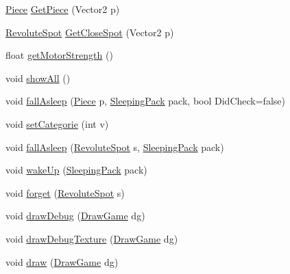 \begin{DoxyCompactItemize}
\item 
\hyperlink{classgearit_1_1src_1_1robot_1_1_piece}{Piece} \hyperlink{classgearit_1_1src_1_1robot_1_1_robot_a52d61f4419b94d1aec0b0838fee09415}{Get\+Piece} (Vector2 p)
\item 
\hyperlink{classgearit_1_1src_1_1robot_1_1_revolute_spot}{Revolute\+Spot} \hyperlink{classgearit_1_1src_1_1robot_1_1_robot_aa347b18c64184d66e2d32ff4f844444c}{Get\+Close\+Spot} (Vector2 p)
\item 
float \hyperlink{classgearit_1_1src_1_1robot_1_1_robot_a6f53b80c92946021a6c167aba200492c}{get\+Motor\+Strength} ()
\item 
void \hyperlink{classgearit_1_1src_1_1robot_1_1_robot_a490e71c6f9c18403b013901844760d0e}{show\+All} ()
\item 
void \hyperlink{classgearit_1_1src_1_1robot_1_1_robot_a20cb38081d33e2c1e69f8229a6b721ea}{fall\+Asleep} (\hyperlink{classgearit_1_1src_1_1robot_1_1_piece}{Piece} p, \hyperlink{classgearit_1_1src_1_1robot_1_1_sleeping_pack}{Sleeping\+Pack} pack, bool Did\+Check=false)
\item 
void \hyperlink{classgearit_1_1src_1_1robot_1_1_robot_af2f16c1240b6009d37b555bd9269b308}{set\+Categorie} (int v)
\item 
void \hyperlink{classgearit_1_1src_1_1robot_1_1_robot_a54ca096aa1e0a7228ce26b77f17cd133}{fall\+Asleep} (\hyperlink{classgearit_1_1src_1_1robot_1_1_revolute_spot}{Revolute\+Spot} s, \hyperlink{classgearit_1_1src_1_1robot_1_1_sleeping_pack}{Sleeping\+Pack} pack)
\item 
void \hyperlink{classgearit_1_1src_1_1robot_1_1_robot_a450b1c0a50d17e1593b7b06b83b1bd10}{wake\+Up} (\hyperlink{classgearit_1_1src_1_1robot_1_1_sleeping_pack}{Sleeping\+Pack} pack)
\item 
void \hyperlink{classgearit_1_1src_1_1robot_1_1_robot_a60ea55dc2a7344abde409f0295e8ba91}{forget} (\hyperlink{classgearit_1_1src_1_1robot_1_1_revolute_spot}{Revolute\+Spot} s)
\item 
void \hyperlink{classgearit_1_1src_1_1robot_1_1_robot_ab6bbb7f8be1a761c89c752d033da343e}{draw\+Debug} (\hyperlink{classgearit_1_1src_1_1_draw_game}{Draw\+Game} dg)
\item 
void \hyperlink{classgearit_1_1src_1_1robot_1_1_robot_a1a6d789f58adfed9b7d1d303a3a9f120}{draw\+Debug\+Texture} (\hyperlink{classgearit_1_1src_1_1_draw_game}{Draw\+Game} dg)
\item 
void \hyperlink{classgearit_1_1src_1_1robot_1_1_robot_ac2660fc968c5a45753f18718732186cb}{draw} (\hyperlink{classgearit_1_1src_1_1_draw_game}{Draw\+Game} dg)

\end{DoxyCompactItemize}
